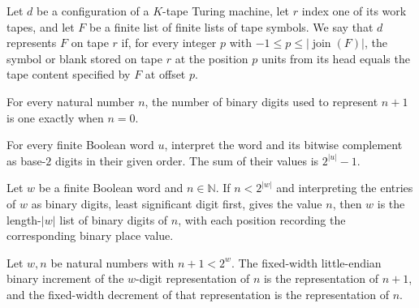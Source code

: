 \begin{definition}
\label{Turing.RecordAt}
\leanok
{}
Let $d$ be a configuration of a $K$-tape Turing machine, let $r$ index one of its work
tapes, and let $F$ be a finite list of finite lists of tape symbols. We say that $d$
represents $F$ on tape $r$ if, for every integer $p$ with $-1 \le p \le
|\operatorname{join}(F)|$, the symbol or blank stored on tape $r$ at the position $p$
units from its head equals the tape content specified by $F$ at offset $p$.
\end{definition}

\begin{theorem}
\label{Turing.recordStep_width_one}
\leanok
{}
For every natural number $n$, the number of binary digits used to represent $n+1$ is one
exactly when $n=0$.
\end{theorem}

\begin{theorem}
\label{Turing.recordStep_complement_value}
\leanok
{}
For every finite Boolean word $u$, interpret the word and its bitwise complement as
base-$2$ digits in their given order. The sum of their values is $2^{|u|}-1$.
\end{theorem}

\begin{theorem}
\label{Turing.recordStep_word_of_value}
\leanok
{}
Let $w$ be a finite Boolean word and $n\in\mathbb{N}$. If $n<2^{|w|}$ and interpreting
the entries of $w$ as binary digits, least significant digit first, gives the value $n$,
then $w$ is the length-$|w|$ list of binary digits of $n$, with each position recording
the corresponding binary place value.
\end{theorem}

\begin{theorem}
\label{Turing.recordStep_digits_succ}
\leanok
{}
Let $w,n$ be natural numbers with $n+1<2^w$. The fixed-width little-endian binary
increment of the $w$-digit representation of $n$ is the representation of $n+1$, and the
fixed-width decrement of that representation is the representation of $n$.
\end{theorem}

